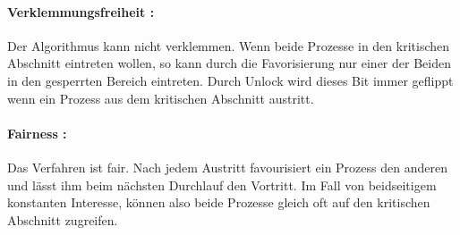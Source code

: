 \paragraph{ Verklemmungsfreiheit : } Der Algorithmus kann nicht verklemmen. Wenn beide Prozesse in den kritischen Abschnitt eintreten wollen, so kann durch die Favorisierung nur einer der Beiden in den gesperrten Bereich eintreten. Durch Unlock wird dieses Bit immer geflippt wenn ein Prozess aus dem kritischen Abschnitt austritt.

\paragraph{ Fairness : } Das Verfahren ist fair. Nach jedem Austritt favourisiert ein Prozess den anderen und lässt ihm beim nächsten Durchlauf den Vortritt. Im Fall von beidseitigem konstanten Interesse, können also beide Prozesse gleich oft auf den kritischen Abschnitt zugreifen.
